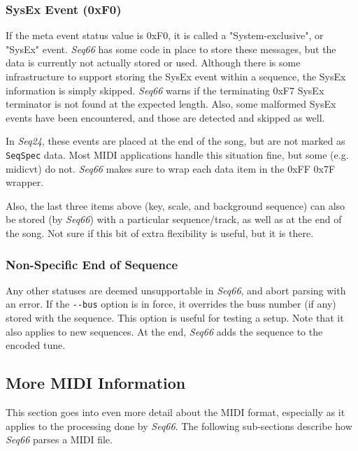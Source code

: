 \subsubsection{SysEx Event (0xF0)}
\label{subsubsec:midi_format_meta_sysex_event}

   If the meta event status value is 0xF0, it is called a "System-exclusive",
   or "SysEx" event.
   \textsl{Seq66} has some code in place to store these messages, but the
   data is currently not actually stored or used.  Although there is some
   infrastructure to support storing the SysEx event within a sequence, the
   SysEx information is simply skipped.  \textsl{Seq66} warns if the
   terminating 0xF7 SysEx terminator is not found at the expected length.
   Also, some malformed SysEx events have been encountered, and those are
   detected and skipped as well.

   In \textsl{Seq24}, these events are placed at the end of the song, but are
   not marked as
   \texttt{SeqSpec} data.  Most MIDI applications handle this situation
   fine, but some (e.g. midicvt) do not.  \textsl{Seq66} makes
   sure to wrap each data item in the 0xFF 0x7F wrapper.

   Also, the last three items above (key, scale, and background sequence) can
   also be stored (by \textsl{Seq66}) with a particular sequence/track,
   as well as at the end of the song.  Not sure if this bit of extra
   flexibility is useful, but it is there.

\subsubsection{Non-Specific End of Sequence}
\label{subsubsec:midi_format_meta_sequence_ends}

   Any other statuses are deemed unsupportable in \textsl{Seq66}, and
   abort parsing with an error.
   If the \texttt{-{}-bus} option is in force, it overrides the buss number (if
   any) stored with the sequence.  This option is useful for testing a setup.
   Note that it also applies to new sequences.
   At the end, \textsl{Seq66} adds the sequence to the encoded tune.

\subsection{More MIDI Information}
\label{subsec:midi_information_more}

   This section goes into even more detail about the MIDI format, especially as
   it applies to the processing done by \textsl{Seq66}.
   The following sub-sections describe how \textsl{Seq66}
   parses a MIDI file.


